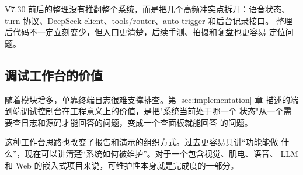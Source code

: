 V7.30 前后的整理没有推翻整个系统，而是把几个高频冲突点拆开：语音状态、
turn 协议、DeepSeek client、tools/router、auto trigger 和后台记录接口。
整理后代码不一定立刻变少，但入口更清楚，后续手测、拍摄和复盘也更容易
定位问题。

\subsection{调试工作台的价值}

随着模块增多，单靠终端日志很难支撑排查。第 \ref{sec:implementation} 章
描述的端到端调试控制台在工程意义上的价值，是把"系统当前处于哪一个
状态"从一个需要查日志和源码才能回答的问题，变成一个查面板就能回答
的问题。

这种工作台思路也改变了报告和演示的组织方式。过去更容易只讲“功能能做
什么”，现在可以讲清楚“系统如何被维护”。对于一个包含视觉、肌电、语音、
LLM 和 Web 的嵌入式项目来说，可维护性本身就是完成度的一部分。


